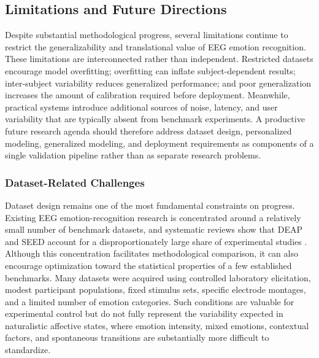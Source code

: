 \documentclass{WileyMSP-template}
\begin{document}
\subsection{Limitations and Future Directions}
\label{subsec:limitations_future}

Despite substantial methodological progress, several limitations continue to restrict the generalizability and translational value of EEG emotion recognition. These limitations are interconnected rather than independent. Restricted datasets encourage model overfitting; overfitting can inflate subject-dependent results; inter-subject variability reduces generalized performance; and poor generalization increases the amount of calibration required before deployment. Meanwhile, practical systems introduce additional sources of noise, latency, and user variability that are typically absent from benchmark experiments. A productive future research agenda should therefore address dataset design, personalized modeling, generalized modeling, and deployment requirements as components of a single validation pipeline rather than as separate research problems.

\subsubsection{Dataset-Related Challenges}
\label{subsubsec:dataset_challenges}

Dataset design remains one of the most fundamental constraints on progress. Existing EEG emotion-recognition research is concentrated around a relatively small number of benchmark datasets, and systematic reviews show that DEAP and SEED account for a disproportionately large share of experimental studies \cite{prabowo2023eegslr}. Although this concentration facilitates methodological comparison, it can also encourage optimization toward the statistical properties of a few established benchmarks. Many datasets were acquired using controlled laboratory elicitation, modest participant populations, fixed stimulus sets, specific electrode montages, and a limited number of emotion categories. Such conditions are valuable for experimental control but do not fully represent the variability expected in naturalistic affective states, where emotion intensity, mixed emotions, contextual factors, and spontaneous transitions are substantially more difficult to standardize.
\end{document}
